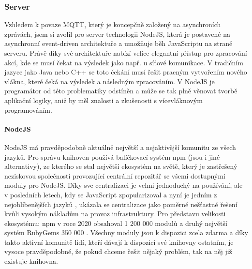 \subsubsection{Server}    %
Vzhledem k povaze MQTT, který je koncepčně založený na asynchroních zprávách, jsem si zvolil pro server technologii NodeJS, která je postavené na asynchronní event-driven architektuře \cite{nodejs} a umožňuje běh JavaScriptu na straně serveru. Právě díky své architektuře nabízí velice elegantní přístup pro zpracování akcí, kde se musí čekat na výsledek jako např. u síťové komunikace. V tradičním jazyce jako Java nebo C++ se toto čekání musí řešit pracným vytvořením nového vlákna, které čeká na výsledek a následným zpracováním. V NodeJS je programátor od této problematiky odstíněn a může se tak plně věnovat tvorbě aplikační logiky, aniž by měl znalosti a zkušenosti s vícevláknovým programováním.

\paragraph{NodeJS} NodeJS má pravděpodobně aktuálně největší a nejaktivější komunitu ze všech jazyků. Pro správu knihoven používá balíčkovací systém npm (jsou i jiné alternativy), ze kterého se stal největší ekosystém na světě, který je zastřešený neziskovou společností  provozující centrální repozitář se všemi dostupnými moduly pro NodeJS. Díky sve centralizaci je velmi jednoduchý na používání, ale v posledních letech, kdy se JavaScript zpopularizoval a nyní je jedním z nejoblíbenějších jazyků \cite{survey-languages}, ukázala se centralizace jako poměrně nešťastné řešení kvůli vysokým nákladům na provoz infrastruktury. Pro představu velikosti ekosystému: npm v roce 2020 obsahoval 1 200 000 modulů a druhý největší systém RubyGems  350 000 \cite{modulecounts}. Všechny moduly jsou k dispozici zcela zdarma a díky takto aktivní komunitě lidí, kteří dávají k dispozici své knihovny ostatním, je vysoce pravděpodobné, že pokud chceme řešit nějaký problém, tak na něj již existuje knihovna.

